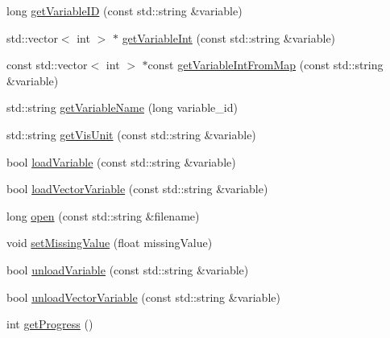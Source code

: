 \begin{DoxyCompactItemize}
\item 
long \hyperlink{classccmc_1_1_kameleon_a947844b073cd69416917c9a0356a87d4}{get\-Variable\-I\-D} (const std\-::string \&variable)
\item 
std\-::vector$<$ int $>$ $\ast$ \hyperlink{classccmc_1_1_kameleon_afe1a3bbd2e665a33382c034098610829}{get\-Variable\-Int} (const std\-::string \&variable)
\item 
const std\-::vector$<$ int $>$ $\ast$const \hyperlink{classccmc_1_1_kameleon_a5c24ccd86ff1ffba4331f6a6a2231de4}{get\-Variable\-Int\-From\-Map} (const std\-::string \&variable)
\item 
std\-::string \hyperlink{classccmc_1_1_kameleon_a5119c010a235022bace10b7d6836a8a1}{get\-Variable\-Name} (long variable\-\_\-id)
\item 
std\-::string \hyperlink{classccmc_1_1_kameleon_a2d39ff33a302957d312122ff6127a4dc}{get\-Vis\-Unit} (const std\-::string \&variable)
\item 
bool \hyperlink{classccmc_1_1_kameleon_aab904337fec75f487e3082bc8eaec9f3}{load\-Variable} (const std\-::string \&variable)
\item 
bool \hyperlink{classccmc_1_1_kameleon_adeadf4c0fba486395e4bc2e73efa8002}{load\-Vector\-Variable} (const std\-::string \&variable)
\item 
long \hyperlink{classccmc_1_1_kameleon_ace633091252d6094098626ee6c295c61}{open} (const std\-::string \&filename)
\item 
void \hyperlink{classccmc_1_1_kameleon_a7caddec8830e6eec4ae9f4d971e43207}{set\-Missing\-Value} (float missing\-Value)
\item 
bool \hyperlink{classccmc_1_1_kameleon_a332b46cd76f5ddf5074e7380d84de352}{unload\-Variable} (const std\-::string \&variable)
\item 
bool \hyperlink{classccmc_1_1_kameleon_ade27fad11dc2a044fff40cee11376637}{unload\-Vector\-Variable} (const std\-::string \&variable)
\item 
int \hyperlink{classccmc_1_1_kameleon_ad2b623976f8ac7c69f35549669f01bc5}{get\-Progress} ()
\end{DoxyCompactItemize}
